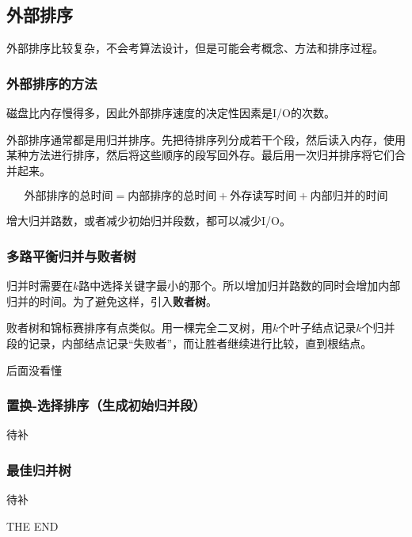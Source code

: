 \documentclass[12pt, a4paper, oneside]{ctexart}
\begin{document}
\subsection{外部排序}

外部排序比较复杂，不会考算法设计，但是可能会考概念、方法和排序过程。

\subsubsection{外部排序的方法}

磁盘比内存慢得多，因此外部排序速度的决定性因素是I/O的次数。

外部排序通常都是用归并排序。先把待排序列分成若干个段，然后读入内存，使用某种方法进行排序，然后将这些顺序的段写回外存。最后用一次归并排序将它们合并起来。

\begin{equation*}
  \text{外部排序的总时间}=\text{内部排序的总时间}+\text{外存读写时间}+\text{内部归并的时间}
\end{equation*}

增大归并路数，或者减少初始归并段数，都可以减少I/O。

\subsubsection{多路平衡归并与败者树}

归并时需要在$k$路中选择关键字最小的那个。所以增加归并路数的同时会增加内部归并的时间。为了避免这样，引入\textbf{败者树}。

败者树和锦标赛排序有点类似。用一棵完全二叉树，用$k$个叶子结点记录$k$个归并段的记录，内部结点记录“失败者”，而让胜者继续进行比较，直到根结点。

后面没看懂

\subsubsection{置换-选择排序（生成初始归并段）}

待补

\subsubsection{最佳归并树}

待补

\vspace*{30pt}

\begin{center}
  \Large{THE END}
\end{center}
\end{document}
